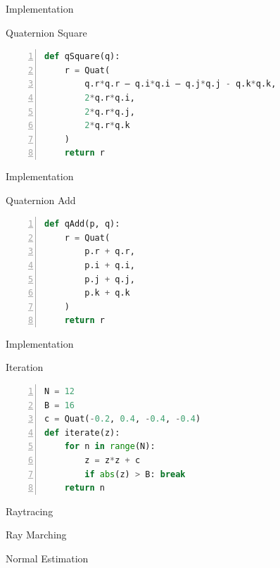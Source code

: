 \documentclass[aspectratio=169,t]{beamer}
\begin{document}
\begin{frame}[label={sec:org77b3ca5},fragile]{Implementation}
 \begin{block}{Quaternion Square}
\begin{lstlisting}[language=Python,firstnumber=1,numbers=left]
def qSquare(q):
    r = Quat(
        q.r*q.r – q.i*q.i – q.j*q.j - q.k*q.k,
        2*q.r*q.i,
        2*q.r*q.j,
        2*q.r*q.k
    )
    return r
\end{lstlisting}
\end{block}
\end{frame}

\begin{frame}[label={sec:org397cf0d},fragile]{Implementation}
 \begin{block}{Quaternion Add}
\begin{lstlisting}[language=Python,firstnumber=1,numbers=left]
def qAdd(p, q):
    r = Quat(
        p.r + q.r,
        p.i + q.i,
        p.j + q.j,
        p.k + q.k
    )
    return r
\end{lstlisting}
\end{block}
\end{frame}

\begin{frame}[label={sec:org375b5fd},fragile]{Implementation}
 \begin{block}{Iteration}
\begin{lstlisting}[language=Python,firstnumber=1,numbers=left]
N = 12
B = 16
c = Quat(-0.2, 0.4, -0.4, -0.4)
def iterate(z):
    for n in range(N):
        z = z*z + c
        if abs(z) > B: break
    return n
\end{lstlisting}
\end{block}
\end{frame}

\begin{frame}[label={sec:orgc997dfb}]{Raytracing}
\end{frame}

\begin{frame}[label={sec:org7aa7ee5}]{Ray Marching}
\end{frame}

\begin{frame}[label={sec:org96a6846}]{Normal Estimation}
\end{frame}
\end{document}
